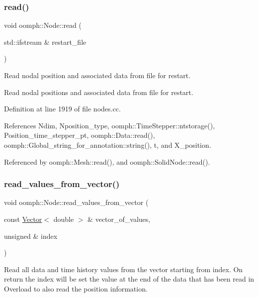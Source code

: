 \subsubsection{\texorpdfstring{read()}{read()}}
{\footnotesize\ttfamily void oomph\+::\+Node\+::read (\begin{DoxyParamCaption}\item[{std\+::ifstream \&}]{restart\+\_\+file }\end{DoxyParamCaption})}



Read nodal position and associated data from file for restart. 

Read nodal positions and associated data from file for restart. 

Definition at line 1919 of file nodes.\+cc.



References Ndim, Nposition\+\_\+type, oomph\+::\+Time\+Stepper\+::ntstorage(), Position\+\_\+time\+\_\+stepper\+\_\+pt, oomph\+::\+Data\+::read(), oomph\+::\+Global\+\_\+string\+\_\+for\+\_\+annotation\+::string(), t, and X\+\_\+position.



Referenced by oomph\+::\+Mesh\+::read(), and oomph\+::\+Solid\+Node\+::read().

\mbox{\label{classoomph_1_1Node_accb033ab8ed4f96331014f7c4cd131f9}} 
\subsubsection{\texorpdfstring{read\+\_\+values\+\_\+from\+\_\+vector()}{read\_values\_from\_vector()}}
{\footnotesize\ttfamily void oomph\+::\+Node\+::read\+\_\+values\+\_\+from\+\_\+vector (\begin{DoxyParamCaption}\item[{const \hyperlink{classoomph_1_1Vector}{Vector}$<$ double $>$ \&}]{vector\+\_\+of\+\_\+values,  }\item[{unsigned \&}]{index }\end{DoxyParamCaption})\hspace{0.3cm}{\ttfamily [virtual]}}



Read all data and time history values from the vector starting from index. On return the index will be set the value at the end of the data that has been read in Overload to also read the position information. 

